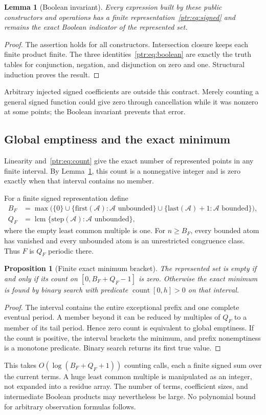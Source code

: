 \documentclass[11pt,letterpaper]{article}
\newtheorem{lemma}[theorem]{Lemma}
\newtheorem{proposition}[theorem]{Proposition}
\theoremstyle{definition}\newtheorem{definition}[theorem]{Definition}
\theoremstyle{remark}\newtheorem{remark}[theorem]{Remark}
\newcommand{\lcm}{\operatorname{lcm}}\newcommand{\rank}{\operatorname{rank}}
\begin{document}
\begin{lemma}[Boolean invariant]\label{ptr:lem:boolean}
Every expression built by these public constructors and operations has a finite representation~\eqref{ptr:eq:signed} and remains the exact Boolean indicator of the represented set.
\end{lemma}
\begin{proof}
The assertion holds for all constructors. Intersection closure keeps each finite product finite. The three identities~\eqref{ptr:eq:boolean} are exactly the truth tables for conjunction, negation, and disjunction on zero and one. Structural induction proves the result.
\end{proof}
Arbitrary injected signed coefficients are outside this contract. Merely counting a general signed function could give zero through cancellation while it was nonzero at some points; the Boolean invariant prevents that error.

\subsection{Global emptiness and the exact minimum}
Linearity and~\eqref{ptr:eq:count} give the exact number of represented points in any finite interval. By Lemma~\ref{ptr:lem:boolean}, this count is a nonnegative integer and is zero exactly when that interval contains no member.

For a finite signed representation define
\begin{align}\label{ptr:eq:eventual}
 B_F&=\max\bigl(\{0\}\cup\{\text{first}(\mathcal A):\mathcal A\text{ unbounded}\}
      \cup\{\text{last}(\mathcal A)+1:\mathcal A\text{ bounded}\}\bigr),\\
 Q_F&=\lcm\{\text{step}(\mathcal A):\mathcal A\text{ unbounded}\},\nonumber
\end{align}
where the empty least common multiple is one. For $n\ge B_F$, every bounded atom has vanished and every unbounded atom is an unrestricted congruence class. Thus $F$ is $Q_F$ periodic there.

\begin{proposition}[Finite exact minimum bracket]\label{ptr:prop:min}
The represented set is empty if and only if its count on $[0,B_F+Q_F-1]$ is zero. Otherwise the exact minimum is found by binary search with predicate $\operatorname{count}[0,h]>0$ on that interval.
\end{proposition}
\begin{proof}
The interval contains the entire exceptional prefix and one complete eventual period. A member beyond it can be reduced by multiples of $Q_F$ to a member of its tail period. Hence zero count is equivalent to global emptiness. If the count is positive, the interval brackets the minimum, and prefix nonemptiness is a monotone predicate. Binary search returns its first true value.
\end{proof}
This takes $O(\log(B_F+Q_F+1))$ counting calls, each a finite signed sum over the current terms. A huge least common multiple is manipulated as an integer, not expanded into a residue array. The number of terms, coefficient sizes, and intermediate Boolean products may nevertheless be large. No polynomial bound for arbitrary observation formulas follows.
\end{document}
